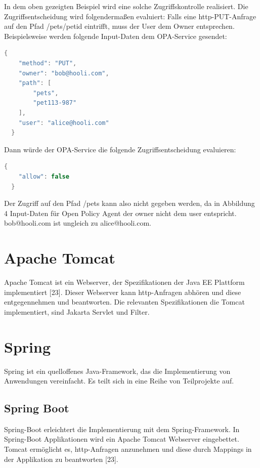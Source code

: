 In dem oben gezeigten Beispiel wird eine solche Zugriffskontrolle realisiert. Die 
Zugriffsentscheidung wird folgendermaßen evaluiert:
Falls eine http-PUT-Anfrage auf den Pfad /pets/{petid} eintrifft, muss der User dem 
Owner entsprechen. Beispielsweise werden folgende Input-Daten dem OPA-Service gesendet:

\begin{lstlisting}[language=C++,frame=tb,caption={Input-Daten für Open Policy Agent},label=lst:Input-DatenfürOpenPolicyAgent]
  {
    "method": "PUT",
    "owner": "bob@hooli.com",
    "path": [
        "pets",
        "pet113-987"
    ],
    "user": "alice@hooli.com"
  }
\end{lstlisting}

Dann würde der OPA-Service die folgende Zugriffsentscheidung evaluieren:

\begin{lstlisting}[language=C++,frame=tb,caption={Zugriffsentscheidung in Rego},label=lst:ZugriffsentscheidunginRego]
  {
    "allow": false
  }
\end{lstlisting}

Der Zugriff auf den Pfad /pets kann also nicht gegeben werden, da in Abbildung 4 Input-Daten für Open Policy Agent der owner nicht dem user entspricht. bob@hooli.com ist ungleich zu alice@hooli.com. 

\section{Apache Tomcat}
Apache Tomcat ist ein Webserver, der Spezifikationen der Java EE Plattform implementiert
[23]. Dieser Webserver kann http-Anfragen abhören und diese entgegennehmen und 
beantworten. Die relevanten Spezifikationen die Tomcat implementiert, sind Jakarta Servlet
und Filter. 

\section{Spring}
Spring ist ein quelloffenes Java-Framework, das die Implementierung von Anwendungen 
vereinfacht. Es teilt sich in eine Reihe von Teilprojekte auf. 

\subsection{Spring Boot}
Spring-Boot erleichtert die Implementierung mit dem Spring-Framework. In Spring-Boot Applikationen wird ein Apache Tomcat Webserver eingebettet. Tomcat ermöglicht es, http-Anfragen anzunehmen und diese durch Mappings in der Applikation zu beantworten [23].

